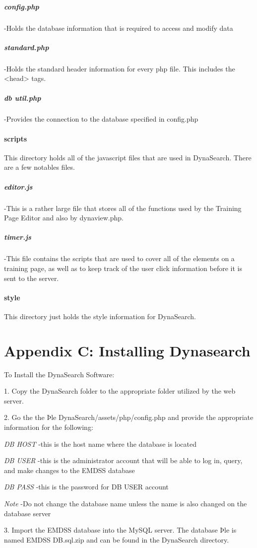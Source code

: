 \documentclass[article]{ij4uq}              %
\begin{document}
\subparagraph{config.php} -Holds the database information that is required to access and modify data 

\subparagraph{standard.php} -Holds the standard header information for every php file. This includes the <head> tags. 
	
\subparagraph{db util.php} -Provides the connection to the database specified in config.php

\paragraph{scripts}
This directory holds all of the javascript files that are used in DynaSearch. There are a few notables files. 

\subparagraph{editor.js} -This is a rather large file that stores all of the functions used by the Training Page Editor and also by dynaview.php.
 	
\subparagraph{timer.js} -This file contains the scripts that are used to cover all of the elements on a training page, as well as to keep track of the user click information before it is sent to the server.

\paragraph{style}
This directory just holds the style information for DynaSearch.

\section{Appendix C: Installing Dynasearch}
To Install the DynaSearch Software:

1. Copy the DynaSearch folder to the appropriate folder utilized by the web server. 

2. Go the the Þle DynaSearch/assets/php/config.php and provide the 
appropriate information for the following: 


\emph{DB HOST} -this is the host name where the database is located
	
\emph{DB USER} -this is the administrator account that will be able to log in, query, and make changes to the EMDSS database
	
\emph{DB PASS} -this is the password for DB USER account
	
\emph{Note} -Do not change the database name unless the name is also changed 
on the database server 

3. Import the EMDSS database into the MySQL server. The database Þle is named EMDSS DB.sql.zip and can be found in the DynaSearch directory. 
\end{document}

